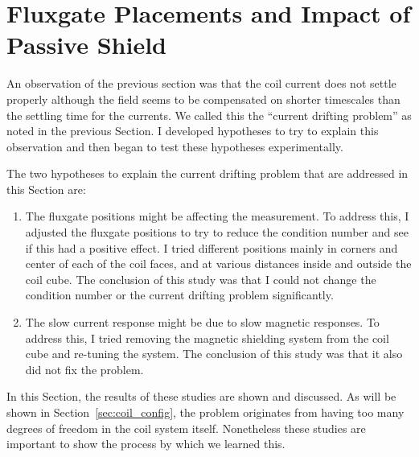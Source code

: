 \section{Fluxgate Placements and Impact of Passive Shield}\label{sec:flux_place}


An observation of the previous section was that the coil current does
not settle properly although the field seems to be compensated on
shorter timescales than the settling time for the currents.  We called
this the ``current drifting problem'' as noted in the previous
Section.  I developed hypotheses to try to explain this observation
and then began to test these hypotheses experimentally.

The two hypotheses to explain the current drifting problem that are
addressed in this Section are:
\begin{enumerate}
\item The fluxgate positions might be affecting the measurement.   To address this, I adjusted the fluxgate positions to try to reduce the condition number and see if this had a positive effect.  I tried different positions mainly in
corners and center of each of the coil faces, and at various distances
inside and outside the coil cube.  The conclusion of this study was
that I could not change the condition number or the current drifting
problem significantly.
\item The slow current response might be due to slow magnetic responses.
To address this, I tried removing the magnetic shielding system from
the coil cube and re-tuning the system.  The conclusion of this study
was that it also did not fix the problem.
\end{enumerate}
In this Section, the results of these studies are shown and discussed.
As will be shown in Section~\ref{sec:coil_config}, the problem
originates from having too many degrees of freedom in the coil system
itself.  Nonetheless these studies are important to show the process
by which we learned this.

